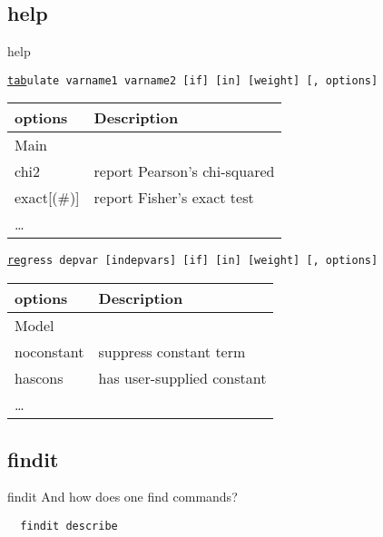 \subsection{help}
\begin{frame}{help} 
\begin{scriptsize}
  \texttt{\underline{tab}ulate \textcolor{Statakeywords}{varname1} \textcolor{Statakeywords}{varname2} [\textcolor{Statakeywords}{if}] [\textcolor{Statakeywords}{in}] [\textcolor{Statakeywords}{weight}] [, options]} \\ \vspace{.5cm}

  \begin{tabular}{ll}
  options & Description \\
  \midrule
  Main & \\
  chi2 & report Pearson's chi-squared \\
  exact[(\#)] & report Fisher's exact test \\
  \dots & \\
  \end{tabular} \vspace{.5cm}

  \texttt{\underline{reg}ress \textcolor{Statakeywords}{depvar} [\textcolor{Statakeywords}{indepvars}] [\textcolor{Statakeywords}{if}] [\textcolor{Statakeywords}{in}] [\textcolor{Statakeywords}{weight}] [, options]} \\
  \vspace{.5cm}
  
  \begin{tabular}{ll}
  options & Description \\
  \midrule
  Model & \\
  noconstant & suppress constant term \\
  hascons & has user-supplied constant \\
  \dots & \\
  \end{tabular}

\end{scriptsize}
\end{frame}

\subsection{findit}
\begin{frame}[fragile]{findit} 
And how does one find commands?
\begin{lstlisting}
  findit describe
\end{lstlisting}


\end{frame}


